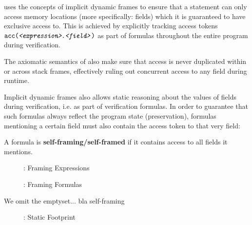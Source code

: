 

\svl uses the concepts of implicit dynamic frames to ensure that a statement can only access memory locations (more specifically: fields) which it is guaranteed to have exclusive access to.
This is achieved by explicitly tracking access tokens $\texttt{acc(\textit{<expression>}.\textit{<field>})}$ as part of formulas throughout the entire program during verification.
    
The axiomatic semantics of \svl also make sure that access is never duplicated within or across stack frames, effectively ruling out concurrent access to any field during runtime.

Implicit dynamic frames also allows static reasoning about the values of fields during verification, i.e. as part of verification formulas.
In order to guarantee that such formulas always reflect the program state (preservation), formulas mentioning a certain field must also contain the access token to that very field:
\begin{definition}
    A formula is \textbf{self-framing/self-framed} if it contains access to all fields it mentions.
\end{definition}




\begin{figure}
    
    \caption{\svl: Framing Expressions}
\end{figure}

\begin{figure}
    
    \caption{\svl: Framing Formulas}
\end{figure}

We omit the emptyset... bla self-framing

\begin{figure}
    
    \caption{\svl: Static Footprint}
\end{figure}
